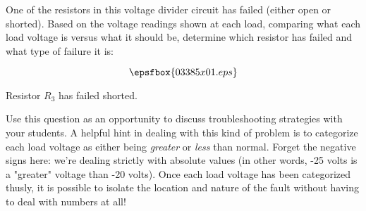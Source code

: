 

One of the resistors in this voltage divider circuit has failed (either open or shorted).  Based on the voltage readings shown at each load, comparing what each load voltage is versus what it should be, determine which resistor has failed and what type of failure it is:

$$\epsfbox{03385x01.eps}$$







Resistor $R_3$ has failed shorted.







Use this question as an opportunity to discuss troubleshooting strategies with your students.  A helpful hint in dealing with this kind of problem is to categorize each load voltage as either being {\it greater} or {\it less} than normal.  Forget the negative signs here: we're dealing strictly with absolute values (in other words, -25 volts is a "greater" voltage than -20 volts).  Once each load voltage has been categorized thusly, it is possible to isolate the location and nature of the fault without having to deal with numbers at all!




